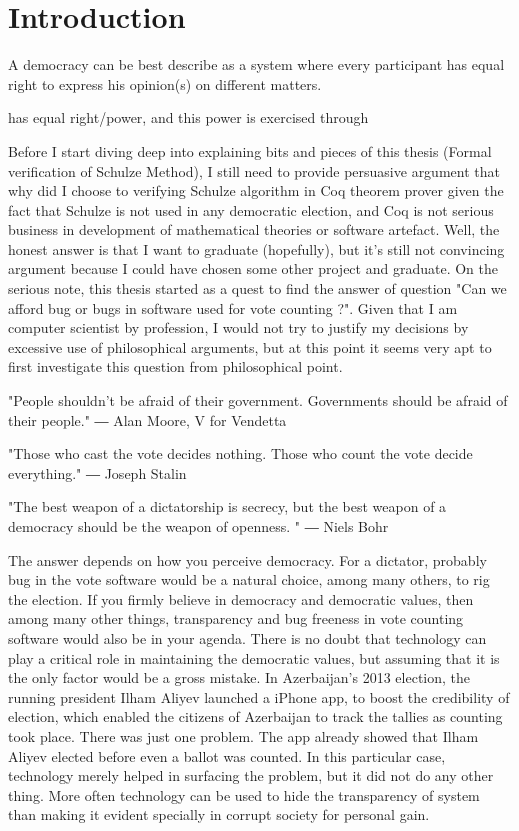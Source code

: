 \chapter{Introduction}
\label{cha:intro}
A democracy can be best describe as a system where every participant 
has equal right to express his opinion(s) on different matters. 

 
has equal right/power, and this power is exercised through 


Before I start diving deep into explaining bits and pieces of this thesis (Formal verification of Schulze Method), 
I still need to provide persuasive  argument that why did I choose to verifying Schulze algorithm in Coq theorem 
prover given the fact that Schulze is not used in any democratic election, and Coq is not serious business in 
development of mathematical theories or software artefact.   Well, the honest answer 
is that  I want to graduate (hopefully), but it's still not convincing argument because I could have chosen 
some other project and graduate.  On the serious note, this thesis started as a quest to 
find the answer of question  "Can we afford bug or bugs in software used for vote counting ?".  Given that I am 
computer scientist by profession, I would not try to justify my decisions by excessive use of philosophical 
arguments, but at this point it seems very apt to first investigate this question from philosophical point. 

"People shouldn't be afraid of their government. Governments should be afraid of their people."
― Alan Moore, V for Vendetta 


"Those who cast the vote decides nothing. Those who count the vote decide everything."
―  Joseph Stalin


"The best weapon of a dictatorship is secrecy, but the best weapon of a democracy should be the 
weapon of openness. " 
―   Niels Bohr

The answer depends on how you perceive democracy.  For a dictator, probably  bug in the 
vote software would be a natural choice, among many others,  to rig the election. If you firmly believe 
in democracy and democratic values, then 
among many other things, transparency and bug freeness in vote counting software  would also be 
in your agenda. There is no doubt that technology can play a critical role in maintaining the democratic values, 
but assuming that it is the only factor would be a gross mistake. 
In Azerbaijan's 2013 election, the running president Ilham Aliyev launched a iPhone app, to boost the 
credibility of election, which enabled the citizens of Azerbaijan to 
track the tallies as counting took place. There was just one problem. The app already showed that 
Ilham Aliyev elected before even a ballot was counted.  In this particular case, technology merely helped in 
surfacing the problem, but it did not do any other thing.  More often technology can be used to hide 
the transparency of system than making it evident specially in corrupt society for personal gain. 


